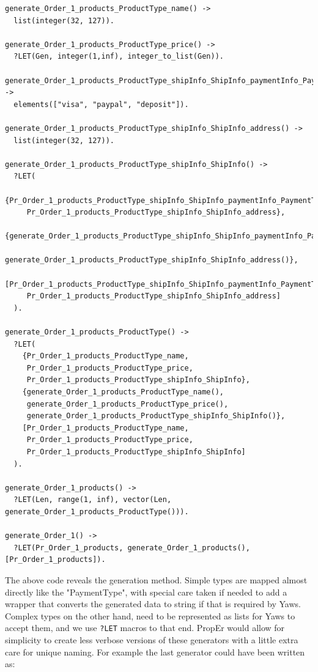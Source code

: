 \documentclass[submission,copyright,a4]{eptcs}
\newcommand{\LET}{\texttt{?LET}\xspace}
\begin{document}
\begin{lstlisting}
generate_Order_1_products_ProductType_name() -> 
  list(integer(32, 127)).

generate_Order_1_products_ProductType_price() ->  
  ?LET(Gen, integer(1,inf), integer_to_list(Gen)).

generate_Order_1_products_ProductType_shipInfo_ShipInfo_paymentInfo_PaymentType() -> 
  elements(["visa", "paypal", "deposit"]).

generate_Order_1_products_ProductType_shipInfo_ShipInfo_address() -> 
  list(integer(32, 127)).

generate_Order_1_products_ProductType_shipInfo_ShipInfo() -> 
  ?LET(
    {Pr_Order_1_products_ProductType_shipInfo_ShipInfo_paymentInfo_PaymentType,
     Pr_Order_1_products_ProductType_shipInfo_ShipInfo_address},
    {generate_Order_1_products_ProductType_shipInfo_ShipInfo_paymentInfo_PaymentType(),
     generate_Order_1_products_ProductType_shipInfo_ShipInfo_address()},
    [Pr_Order_1_products_ProductType_shipInfo_ShipInfo_paymentInfo_PaymentType,
     Pr_Order_1_products_ProductType_shipInfo_ShipInfo_address]
  ).

generate_Order_1_products_ProductType() -> 
  ?LET(
    {Pr_Order_1_products_ProductType_name, 
     Pr_Order_1_products_ProductType_price, 
     Pr_Order_1_products_ProductType_shipInfo_ShipInfo},
    {generate_Order_1_products_ProductType_name(), 
     generate_Order_1_products_ProductType_price(), 
     generate_Order_1_products_ProductType_shipInfo_ShipInfo()},
    [Pr_Order_1_products_ProductType_name, 
     Pr_Order_1_products_ProductType_price, 
     Pr_Order_1_products_ProductType_shipInfo_ShipInfo] 
  ).

generate_Order_1_products() -> 
  ?LET(Len, range(1, inf), vector(Len, generate_Order_1_products_ProductType())).

generate_Order_1() -> 
  ?LET(Pr_Order_1_products, generate_Order_1_products(), [Pr_Order_1_products]).
\end{lstlisting}

The above code reveals the generation method. Simple types are mapped almost directly like the "PaymentType", with special care taken if needed to add a wrapper that converts the generated data to string if that is required by Yaws. Complex types on the other hand, need to be represented as lists for Yaws to accept them, and we use \LET macros to that end. 
PropEr would allow for simplicity to create less verbose versions of these generators with a little extra care for unique naming. For example the last generator could have been written as:
\end{document}
